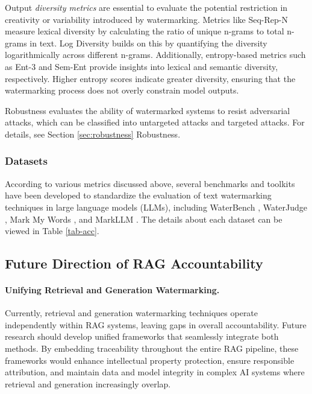 Output \textit{diversity metrics} are essential to evaluate the potential restriction in creativity or variability introduced by watermarking. Metrics like Seq-Rep-N \cite{gu2024on} measure lexical diversity by calculating the ratio of unique n-grams to total n-grams in text. Log Diversity \cite{kirchenbauer2024on} builds on this by quantifying the diversity logarithmically across different n-grams. Additionally, entropy-based metrics such as Ent-3 \cite{hou-etal-2024-semstamp} and Sem-Ent \cite{han-etal-2022-measuring} provide insights into lexical and semantic diversity, respectively. Higher entropy scores indicate greater diversity, ensuring that the watermarking process does not overly constrain model outputs.

Robustness evaluates the ability of watermarked systems to resist adversarial attacks, which can be classified into untargeted attacks and targeted attacks. For details, see Section \ref{sec:robustness} Robustness.

\subsubsection{Datasets}


According to various metrics discussed above, several benchmarks and toolkits have been developed to standardize the evaluation of text watermarking techniques in large language models (LLMs), including WaterBench \cite{tu-etal-2024-waterbench}, WaterJudge \cite{molenda2024waterjudge}, Mark My Words \cite{piet2023mark}, and MarkLLM \cite{pan2024markllm}. The details about each dataset can be viewed in Table \ref{tab-acc}.


\subsection{Future Direction of RAG Accountability}

\paragraph{Unifying Retrieval and Generation Watermarking.} 

Currently, retrieval and generation watermarking techniques operate independently within RAG systems, leaving gaps in overall accountability. Future research should develop unified frameworks that seamlessly integrate both methods. By embedding traceability throughout the entire RAG pipeline, these frameworks would enhance intellectual property protection, ensure responsible attribution, and maintain data and model integrity in complex AI systems where retrieval and generation increasingly overlap.

